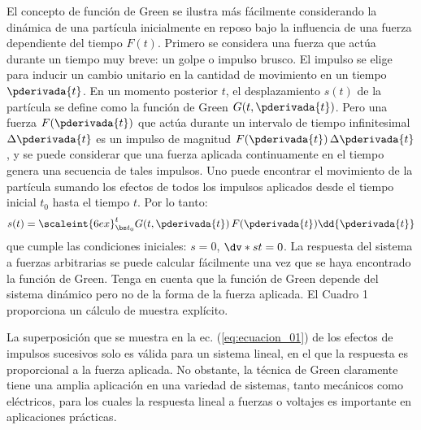 El concepto de función de Green se ilustra más fácilmente considerando la dinámica de una partícula inicialmente en reposo bajo la influencia de una fuerza dependiente del tiempo $F(t)$. Primero se considera una fuerza que actúa durante un tiempo muy breve: un golpe o impulso brusco. El impulso se elige para inducir un cambio unitario en la cantidad de movimiento en un tiempo $\pderivada{t}$. En un momento posterior $t$, el desplazamiento $s(t)$ de la partícula se define como la función de Green $G (t,\pderivada{t})$. Pero una fuerza $F (\pderivada{t})$ que actúa durante un intervalo de tiempo infinitesimal $\Delta \pderivada{t}$ es un impulso de magnitud $F (\pderivada{t}) \, \Delta \pderivada{t}$, y se puede considerar que una fuerza aplicada continuamente en el tiempo genera una secuencia de tales impulsos. Uno puede encontrar el movimiento de la partícula sumando los efectos de todos los impulsos aplicados desde el tiempo inicial $t_{0}$ hasta el tiempo $t$. Por lo tanto:
\begin{align}
s (t) = \scaleint{6ex}_{\bs t_{0}}^{t} G (t, \pderivada{t}) \, F (\pderivada{t}) \dd{\pderivada{t}}
\label{eq:ecuacion_01}
\end{align}
que cumple las condiciones iniciales: $s = 0$, $\dv*{s}{t} = 0$. La respuesta del sistema a fuerzas arbitrarias se puede calcular fácilmente una vez que se haya encontrado la función de Green. Tenga en cuenta que la función de Green depende del sistema dinámico pero no de la forma de la fuerza aplicada. El Cuadro 1 proporciona un cálculo de muestra explícito.
\par
La superposición que se muestra en la ec. (\ref{eq:ecuacion_01}) de los efectos de impulsos sucesivos solo es válida para un sistema lineal, en el que la respuesta es proporcional a la fuerza aplicada. No obstante, la técnica de Green claramente tiene una amplia aplicación en una variedad de sistemas, tanto mecánicos como eléctricos, para los cuales la respuesta lineal a fuerzas o voltajes es importante en aplicaciones prácticas.

